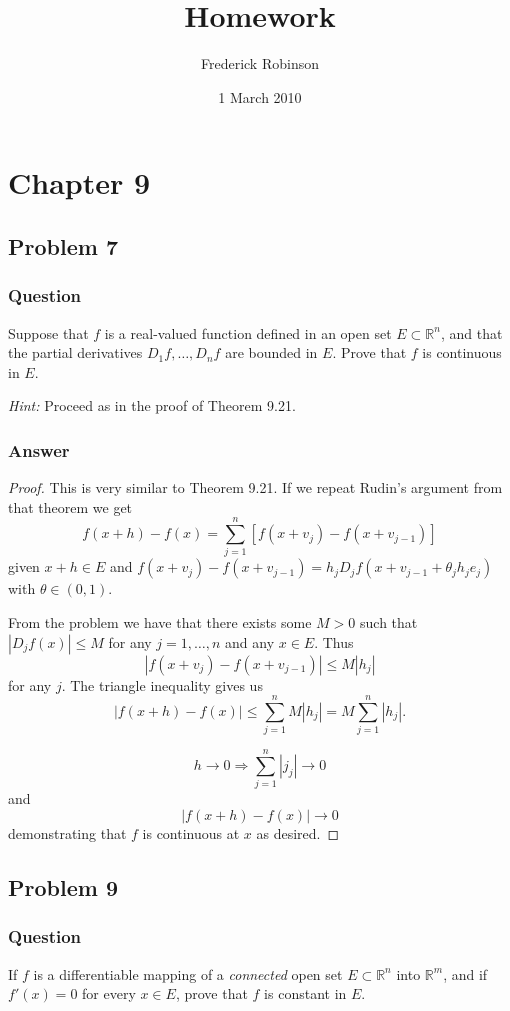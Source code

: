 \documentclass[12pt]{article}
\title{Homework}
\author{Frederick Robinson}
\date{1 March 2010}
\begin{document}

   \maketitle

\setcounter{tocdepth}{2} 


\section{Chapter 9}
\subsection{Problem 7}

\subsubsection{Question}
Suppose that $f$ is a real-valued function defined in an open set $E \subset \mathbb{R}^n$, and that the partial derivatives $D_1 f , \dots, D_n f$ are bounded in $E$. Prove that $f$ is continuous in $E$.

\emph{Hint: }Proceed as in the proof of Theorem 9.21.
\subsubsection{Answer}
\begin{proof}
This is very similar to Theorem 9.21. If we repeat Rudin's argument from that theorem we get
\[f(x+h)-f(x) = \sum_{j=1}^n[f(x+v_j)-f(x+v_{j-1})]\]
given $x+h \in E $ and $f(x+v_j)-f(x+v_{j-1}) =h_jD_jf(x+v_{j-1}+\theta_j h_j e_j) $ with $\theta \in (0,1)$.

From the problem we have that there exists some $M > 0$ such that $|D_j f(x)| \leq M$ for any $j = 1, \dots, n$ and any $x \in E$. Thus
\[|f(x+v_j) - f(x+v_{j-1})| \leq M|h_j|\]
for any $j$. The triangle inequality gives us
\[|f(x+h)-f(x)| \leq \sum_{j=1}^n M|h_j| = M \sum_{j=1}^n |h_j|.\]

\[h \to 0 \Rightarrow \sum_{j=1}^n |j_j| \to 0\] 
and
\[|f(x+h)-f(x)| \to 0\]
demonstrating that $f$ is continuous at $x$ as desired.\end{proof}
\subsection{Problem 9}

\subsubsection{Question}
If $f$ is a differentiable mapping of a \emph{connected} open set $E \subset \mathbb{R}^n$ into $\mathbb{R}^m$, and if $f'(x)=0$ for every $x \in E$, prove that $f$ is constant in $E$.
\end{document}

